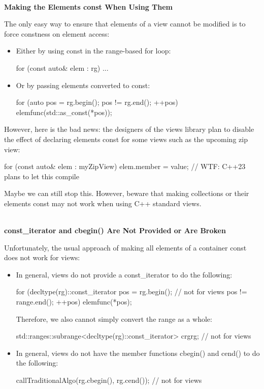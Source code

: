 \noindent
\hspace*{\fill} \\ %
\textbf{Making the Elements const When Using Them}

The only easy way to ensure that elements of a view cannot be modified is to force constness on element access:

\begin{itemize}
\item
Either by using const in the range-based for loop:

\begin{cpp}
for (const auto& elem : rg) {
	...
}
\end{cpp}

\item
Or by passing elements converted to const:

\begin{cpp}
for (auto pos = rg.begin(); pos != rg.end(); ++pos) {
	elemfunc(std::as_const(*pos));
}
\end{cpp}
\end{itemize}

However, here is the bad news: the designers of the views library plan to disable the effect of declaring elements const for some views such as the upcoming zip view:

\begin{cpp}
for (const auto& elem : myZipView) {
	elem.member = value; // WTF: C++23 plans to let this compile
}
\end{cpp}

Maybe we can still stop this. However, beware that making collections or their elements const may not work when using C++ standard views.

\noindent
\hspace*{\fill} \\ %
\textbf{const\_iterator and cbegin() Are Not Provided or Are Broken}

Unfortunately, the usual approach of making all elements of a container const does not work for views:

\begin{itemize}
\item
In general, views do not provide a const\_iterator to do the following:

\begin{cpp}
for (decltype(rg)::const_iterator pos = rg.begin(); // not for views
pos != range.end();
++pos) {
	elemfunc(*pos);
}
\end{cpp}

Therefore, we also cannot simply convert the range as a whole:

\begin{cpp}
std::ranges::subrange<decltype(rg)::const_iterator> crg{rg}; // not for views
\end{cpp}

\item
In general, views do not have the member functions cbegin() and cend() to do the following:

\begin{cpp}
callTraditionalAlgo(rg.cbegin(), rg.cend()); // not for views
\end{cpp}
\end{itemize}


